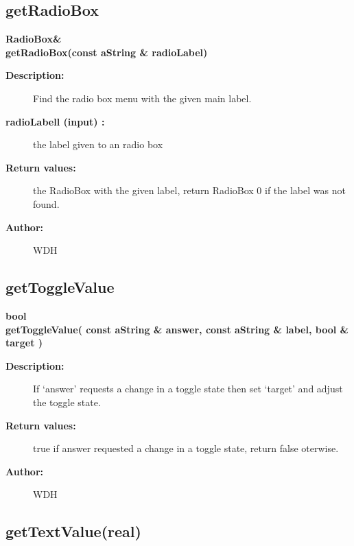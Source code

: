 \subsection{getRadioBox}
 
\begin{flushleft} \textbf{%
RadioBox\&  \\ 
\settowidth{\DialogDataIncludeArgIndent}{getRadioBox(}%
getRadioBox(const aString \& radioLabel)
}\end{flushleft}
\begin{description}
\item[{\bf Description:}]  
    Find the radio box menu with the given main label.
\item[{\bf radioLabell (input) :}]  the label given to an radio box
\item[{\bf Return values:}]  the RadioBox with the given label, return RadioBox 0
 if the label was not found.
\item[{\bf Author:}]  WDH
\end{description}
\subsection{getToggleValue}
 
\begin{flushleft} \textbf{%
bool  \\ 
\settowidth{\DialogDataIncludeArgIndent}{getToggleValue(}%
getToggleValue( const aString \& answer, const aString \& label, bool \& target )
}\end{flushleft}
\begin{description}
\item[{\bf Description:}]  
    If `answer' requests a change in a toggle state then set `target' and adjust the
    toggle state.
\item[{\bf Return values:}]  true if answer requested a change in a toggle state, return false oterwise.
\item[{\bf Author:}]  WDH
\end{description}
\subsection{getTextValue(real)}
 
